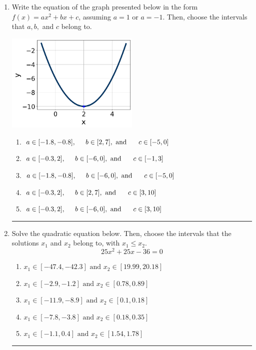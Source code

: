 \documentclass[14pt]{extbook}
\newcommand{\litem}[1]{\item#1\hspace*{-1cm}\rule{\textwidth}{0.4pt}}
\begin{document}
\begin{enumerate}
{\begin{enumerate}[label=\Alph*.]
\end{enumerate} }
\litem{
Write the equation of the graph presented below in the form $f(x)=ax^2+bx+c$, assuming  $a=1$ or $a=-1$. Then, choose the intervals that $a, b,$ and $c$ belong to.
\begin{center}
    \includegraphics[width=0.5\textwidth]{../Figures/quadraticGraphToEquationCopyB.png}
\end{center}
\begin{enumerate}[label=\Alph*.]
\item \( a \in [-1.8, -0.8], \hspace*{5mm} b \in [2, 7], \text{ and } \hspace*{5mm} c \in [-5, 0] \)
\item \( a \in [-0.3, 2], \hspace*{5mm} b \in [-6, 0], \text{ and } \hspace*{5mm} c \in [-1, 3] \)
\item \( a \in [-1.8, -0.8], \hspace*{5mm} b \in [-6, 0], \text{ and } \hspace*{5mm} c \in [-5, 0] \)
\item \( a \in [-0.3, 2], \hspace*{5mm} b \in [2, 7], \text{ and } \hspace*{5mm} c \in [3, 10] \)
\item \( a \in [-0.3, 2], \hspace*{5mm} b \in [-6, 0], \text{ and } \hspace*{5mm} c \in [3, 10] \)

\end{enumerate} }
\litem{
Solve the quadratic equation below. Then, choose the intervals that the solutions $x_1$ and $x_2$ belong to, with $x_1 \leq x_2$.\[ 25x^{2} +25 x -36 = 0 \]\begin{enumerate}[label=\Alph*.]
\item \( x_1 \in [-47.4, -42.3] \text{ and } x_2 \in [19.99, 20.18] \)
\item \( x_1 \in [-2.9, -1.2] \text{ and } x_2 \in [0.78, 0.89] \)
\item \( x_1 \in [-11.9, -8.9] \text{ and } x_2 \in [0.1, 0.18] \)
\item \( x_1 \in [-7.8, -3.8] \text{ and } x_2 \in [0.18, 0.35] \)
\item \( x_1 \in [-1.1, 0.4] \text{ and } x_2 \in [1.54, 1.78] \)


\end{enumerate}}
\end{enumerate}
\end{document}
